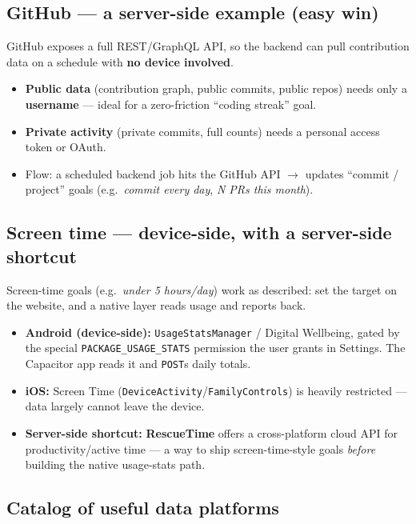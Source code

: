 \documentclass[11pt,a4paper]{article}
\begin{document}
\subsection{GitHub --- a server-side example (easy win)}
GitHub exposes a full REST/GraphQL API, so the backend can pull contribution data
on a schedule with \textbf{no device involved}.
\begin{itemize}
  \item \textbf{Public data} (contribution graph, public commits, public repos) needs
        only a \textbf{username} --- ideal for a zero-friction ``coding streak'' goal.
  \item \textbf{Private activity} (private commits, full counts) needs a personal
        access token or OAuth.
  \item Flow: a scheduled backend job hits the GitHub API $\rightarrow$ updates
        ``commit / project'' goals (e.g.\ \emph{commit every day}, \emph{N PRs this month}).
\end{itemize}

\subsection{Screen time --- device-side, with a server-side shortcut}
Screen-time goals (e.g.\ \emph{under 5 hours/day}) work as described: set the target
on the website, and a native layer reads usage and reports back.
\begin{itemize}
  \item \textbf{Android (device-side):} \texttt{UsageStatsManager} / Digital Wellbeing,
        gated by the special \texttt{PACKAGE\_USAGE\_STATS} permission the user grants
        in Settings. The Capacitor app reads it and \texttt{POST}s daily totals.
  \item \textbf{iOS:} Screen Time (\texttt{DeviceActivity}/\texttt{FamilyControls}) is
        heavily restricted --- data largely cannot leave the device.
  \item \textbf{Server-side shortcut:} \textbf{RescueTime} offers a cross-platform
        cloud API for productivity/active time --- a way to ship screen-time-style
        goals \emph{before} building the native usage-stats path.
\end{itemize}

\subsection{Catalog of useful data platforms}
\end{document}
